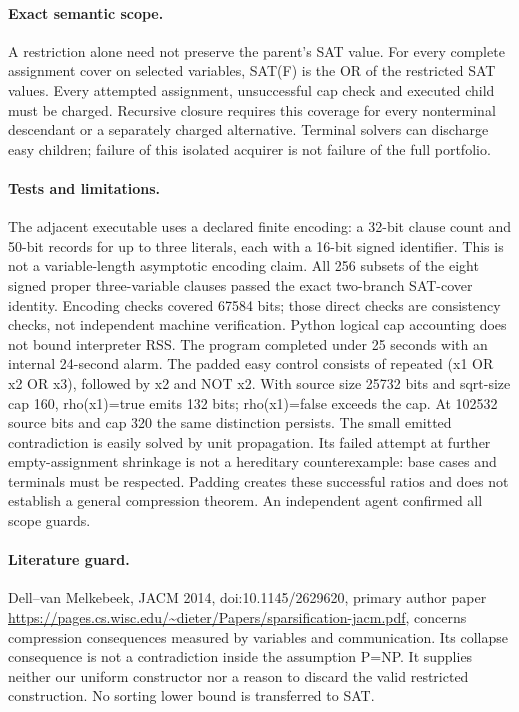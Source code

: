 \documentclass{article}
\begin{document}
\paragraph{Exact semantic scope.}
A restriction alone need not preserve the parent's SAT value.
For every complete assignment cover on selected variables,
SAT(F) is the OR of the restricted SAT values.
Every attempted assignment, unsuccessful cap check and executed child
must be charged. Recursive closure requires this coverage for every
nonterminal descendant or a separately charged alternative.
Terminal solvers can discharge easy children; failure of this isolated
acquirer is not failure of the full portfolio.

\paragraph{Tests and limitations.}
The adjacent executable uses a declared finite encoding: a 32-bit clause
count and 50-bit records for up to three literals, each with a 16-bit signed
identifier. This is not a variable-length asymptotic encoding claim.
All 256 subsets of the eight signed proper three-variable clauses passed
the exact two-branch SAT-cover identity. Encoding checks covered 67584
bits; those direct checks are consistency checks, not independent machine
verification. Python logical cap accounting does not bound interpreter RSS.
The program completed under 25 seconds with an internal 24-second alarm.
The padded easy control consists of repeated (x1 OR x2 OR x3), followed by
x2 and NOT x2. With source size 25732 bits and sqrt-size cap 160,
rho(x1)=true emits 132 bits; rho(x1)=false exceeds the cap.
At 102532 source bits and cap 320 the same distinction persists.
The small emitted contradiction is easily solved by unit propagation.
Its failed attempt at further empty-assignment shrinkage is not a
hereditary counterexample: base cases and terminals must be respected.
Padding creates these successful ratios and does not establish a general
compression theorem. An independent agent confirmed all scope guards.

\paragraph{Literature guard.}
Dell--van Melkebeek, JACM 2014, doi:10.1145/2629620, primary author paper
\url{https://pages.cs.wisc.edu/~dieter/Papers/sparsification-jacm.pdf},
concerns compression consequences measured by variables and communication.
Its collapse consequence is not a contradiction inside the assumption P=NP.
It supplies neither our uniform constructor nor a reason to discard the
valid restricted construction. No sorting lower bound is transferred to SAT.
\end{document}
